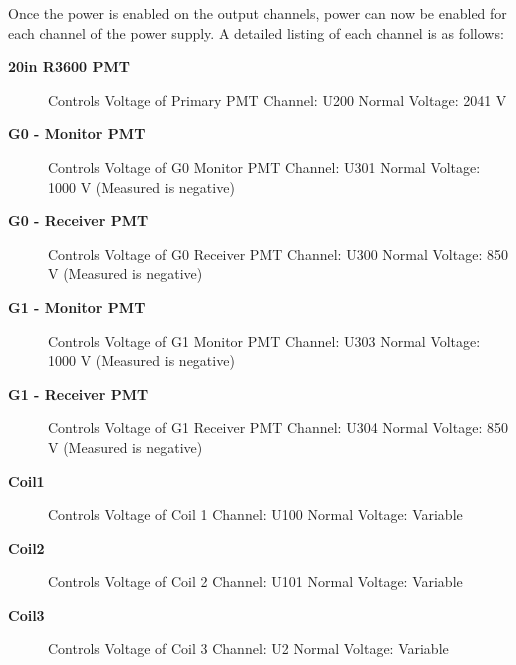 \documentclass[twoside,letterpaper]{refart}
\begin{document}
Once the power is enabled on the output channels, power can now be enabled for each channel of the power supply. A detailed listing of each channel is as follows:

\begin{description}
	
	\item[\textbf{20in R3600 PMT}] Controls Voltage of Primary PMT\newline
	Channel:  U200 \newline
	Normal Voltage:  2041 V
	
	\item[\textbf{G0 - Monitor PMT}] Controls Voltage of G0 Monitor PMT\newline
	Channel:  U301 \newline
	Normal Voltage:  1000 V (Measured is negative)
	
	\item[\textbf{G0 - Receiver PMT}] Controls Voltage of G0 Receiver PMT\newline
	Channel:  U300 \newline
	Normal Voltage:  850 V (Measured is negative)
	
	\item[\textbf{G1 - Monitor PMT}] Controls Voltage of G1 Monitor PMT\newline
	Channel:  U303 \newline
	Normal Voltage:  1000 V (Measured is negative)
	
	\item[\textbf{G1 - Receiver PMT}] Controls Voltage of G1 Receiver PMT\newline
	Channel:  U304 \newline
	Normal Voltage:  850 V (Measured is negative)
		
	\item[\textbf{Coil1}] Controls Voltage of Coil 1\newline
	Channel:  U100 \newline
	Normal Voltage:  Variable
	
	\item[\textbf{Coil2}] Controls Voltage of Coil 2\newline
	Channel:  U101 \newline
	Normal Voltage:  Variable
	
	\item[\textbf{Coil3}] Controls Voltage of Coil 3\newline
	Channel:  U2 \newline
	Normal Voltage:  Variable
	

\end{description}
\end{document}
